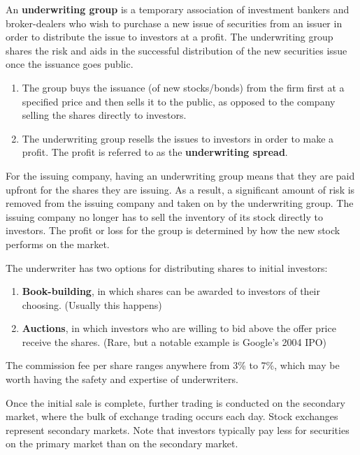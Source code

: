 \documentclass{article}
\begin{document}
    \begin{definition}[Underwriters]
    An \textbf{underwriting group} is a temporary association of investment bankers and broker-dealers who wish to purchase a new issue of securities from an issuer in order to distribute the issue to investors at a profit. The underwriting group shares the risk and aids in the successful distribution of the new securities issue once the issuance goes public. 
    \begin{enumerate}
        \item The group buys the issuance (of new stocks/bonds) from the firm first at a specified price and then sells it to the public, as opposed to the company selling the shares directly to investors. 
        \item The underwriting group resells the issues to investors in order to make a profit. The profit is referred to as the \textbf{underwriting spread}. 
    \end{enumerate}
    For the issuing company, having an underwriting group means that they are paid upfront for the shares they are issuing. As a result, a significant amount of risk is removed from the issuing company and taken on by the underwriting group. The issuing company no longer has to sell the inventory of its stock directly to investors. The profit or loss for the group is determined by how the new stock performs on the market. 

    The underwriter has two options for distributing shares to initial investors: 
    \begin{enumerate}
        \item \textbf{Book-building}, in which shares can be awarded to investors of their choosing. (Usually this happens) 
        \item \textbf{Auctions}, in which investors who are willing to bid above the offer price receive the shares. (Rare, but a notable example is Google's 2004 IPO)
    \end{enumerate}
    The commission fee per share ranges anywhere from 3\% to 7\%, which may be worth having the safety and expertise of underwriters. 
    \end{definition}

    Once the initial sale is complete, further trading is conducted on the secondary market, where the bulk of exchange trading occurs each day. Stock exchanges represent secondary markets. Note that investors typically pay less for securities on the primary market than on the secondary market. 
\end{document}
